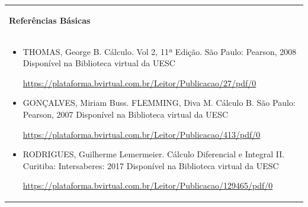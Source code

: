 \documentclass[12pt,a4paper]{article}
\begin{document}
\begin{tabular}{|p{16.8cm}|}
\hline
\begin{center}
  {\bf Referências Básicas}
\end{center}\\
\begin{itemize}
  \item THOMAS, George B. Cálculo. Vol 2, 11ª Edição. São Paulo: Pearson, 2008
  Disponível na Biblioteca virtual da UESC

  \url{https://plataforma.bvirtual.com.br/Leitor/Publicacao/27/pdf/0}


  \item GONÇALVES, Miriam Buss. FLEMMING, Diva M. Cálculo B. São Paulo: Pearson, 2007
  Disponível na Biblioteca virtual da UESC

  \url{https://plataforma.bvirtual.com.br/Leitor/Publicacao/413/pdf/0}


  \item RODRIGUES, Guilherme Lemermeier. Cálculo Diferencial e Integral II. Curitiba: Intersaberes: 2017
  Disponível na Biblioteca virtual da UESC

  \url{https://plataforma.bvirtual.com.br/Leitor/Publicacao/129465/pdf/0}

\end{itemize}

\\
\hline
\end{tabular}
\end{document}

